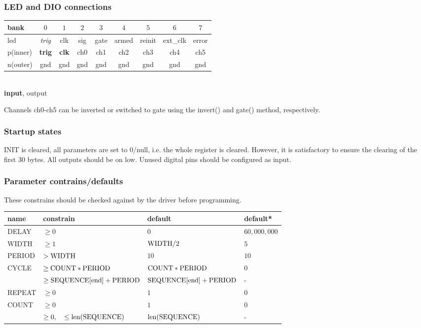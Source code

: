 \documentclass{article}
\begin{document}
\subsubsection*{LED and DIO connections}
	\begin{tabular}[t]{l|cccccccc}
		bank & $0$  & $1$  & $2$  & $3$  & $4$  & $5$ & $6$ & $7$ \\ \hline
		led  & \textit{trig}  & clk  & sig  & gate  & armed  & reinit & ext\_clk & error \\
		p(inner) & \textbf{trig} &  \textbf{clk}  & ch0  & ch1 & ch2 & ch3 & ch4 & ch5 \\
		n(outer) &         gnd   &          gnd   & gnd  & gnd & gnd & gnd & gnd & gnd \\
	\end{tabular}	\\\textbf{input}, output
	
Channels ch0-ch5 can be inverted or switched to gate using the invert() and gate() method, respectively. 

\subsubsection*{Startup states}
INIT is cleared, all parameters are set to 0/null, i.e. the whole register is cleared. However, it is satisfactory to ensure the clearing of the first 30 bytes. All outputs should be on low. Unused digital pins should be configured as input.

\subsubsection*{Parameter contrains/defaults}
These constrains should be checked against by the driver before programming.\\
\begin{tabular}{llll}
name  &constrain&default&default*\\\hline
DELAY &$\geq0$&$0$&$60,000,000$\\
WIDTH &$\geq1$&$\rm{WIDTH}/2$&$5$\\
PERIOD&$>\rm{WIDTH}$&$10$&$10$\\
CYCLE &$\geq\rm{COUNT}*\rm{PERIOD}$&$\rm{COUNT}*\rm{PERIOD}$&$0$\\
&$\geq\rm{SEQUENCE[end]}+\rm{PERIOD}$&$\rm{SEQUENCE[end]}+\rm{PERIOD}$&-\\
REPEAT&$\geq0$&$1$&$0$\\
COUNT &$\geq0$&$1$&$0$\\
 &$\geq0,\quad \leq \rm{len}(\rm{SEQUENCE})$&$\rm{len}(\rm{SEQUENCE})$&-\\
\end{tabular}
\end{document}
